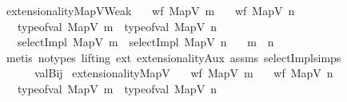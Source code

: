 \begin{isabellebody}
\isamarkupfalse%
%
\endisatagproof
{\isafoldproof}%
%
\isadelimproof
\isanewline
%
\endisadelimproof
\isanewline
\isanewline
{}\isamarkupfalse%
\ extensionalityMapVWeak{\isacharcolon}{\kern0pt}\isanewline
\ \ \ {\isachardoublequoteopen}wf\ {\isacharparenleft}{\kern0pt}MapV\ m{\isacharparenright}{\kern0pt}{\isachardoublequoteclose}\isanewline
\ \ \ {\isachardoublequoteopen}wf\ {\isacharparenleft}{\kern0pt}MapV\ n{\isacharparenright}{\kern0pt}{\isachardoublequoteclose}\isanewline
\ \ \ {\isachardoublequoteopen}type{\isacharunderscore}{\kern0pt}of{\isacharunderscore}{\kern0pt}val\ {\isacharparenleft}{\kern0pt}MapV\ m{\isacharparenright}{\kern0pt}\ {\isacharequal}{\kern0pt}\ type{\isacharunderscore}{\kern0pt}of{\isacharunderscore}{\kern0pt}val\ {\isacharparenleft}{\kern0pt}MapV\ n{\isacharparenright}{\kern0pt}{\isachardoublequoteclose}\isanewline
\ \ \ {\isachardoublequoteopen}selectImpl\ {\isacharparenleft}{\kern0pt}MapV\ m{\isacharparenright}{\kern0pt}\ {\isacharequal}{\kern0pt}\ selectImpl\ {\isacharparenleft}{\kern0pt}MapV\ n{\isacharparenright}{\kern0pt}{\isachardoublequoteclose}\isanewline
\ \ \ {\isachardoublequoteopen}m\ {\isacharequal}{\kern0pt}\ n{\isachardoublequoteclose}\isanewline
%
\isadelimproof
\ \ %
\endisadelimproof
%
\isatagproof
{}\isamarkupfalse%
\ {\isacharparenleft}{\kern0pt}metis\ {\isacharparenleft}{\kern0pt}no{\isacharunderscore}{\kern0pt}types{\isacharcomma}{\kern0pt}\ lifting{\isacharparenright}{\kern0pt}\ ext\ extensionalityAux\ assms{\isacharparenleft}{\kern0pt}{}{\isacharcomma}{\kern0pt}{}{\isacharcomma}{\kern0pt}{}{\isacharcomma}{\kern0pt}{}{\isacharparenright}{\kern0pt}\ selectImpl{\isachardot}{\kern0pt}simps\isanewline
\ \ \ \ \ \ valBij{\isacharparenright}{\kern0pt}%
\endisatagproof
{\isafoldproof}%
%
\isadelimproof
\isanewline
%
\endisadelimproof
\isanewline
\isanewline
{}\isamarkupfalse%
\ extensionalityMapV{\isacharcolon}{\kern0pt}\isanewline
\ \ \ {\isachardoublequoteopen}wf\ {\isacharparenleft}{\kern0pt}MapV\ m{\isacharparenright}{\kern0pt}{\isachardoublequoteclose}\isanewline
\ \ \ {\isachardoublequoteopen}wf\ {\isacharparenleft}{\kern0pt}MapV\ n{\isacharparenright}{\kern0pt}{\isachardoublequoteclose}\isanewline
\ \ \ {\isachardoublequoteopen}type{\isacharunderscore}{\kern0pt}of{\isacharunderscore}{\kern0pt}val\ {\isacharparenleft}{\kern0pt}MapV\ m{\isacharparenright}{\kern0pt}\ {\isacharequal}{\kern0pt}\ type{\isacharunderscore}{\kern0pt}of{\isacharunderscore}{\kern0pt}val\ {\isacharparenleft}{\kern0pt}MapV\ n{\isacharparenright}{\kern0pt}{\isachardoublequoteclose}\isanewline

\end{isabellebody}
